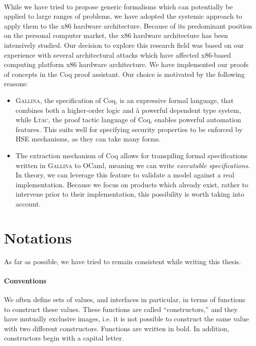 \paragraph{}
%
While we have tried to propose generic formalisms which can potentially be
applied to large ranges of problems, we have adopted the systemic approach to
apply them to the x86 hardware architecture.
%
Because of its predominant position on the personal computer market, the x86
hardware architecture has been intensively studied.
%
Our decision to explore this research field was based on our experience with
several architectural attacks which have affected x86-based computing platform
x86 hardware architecture.
%
We have implemented our proofs of concepts in the Coq proof assistant.
%
Our choice is motivated by the following reasons:
%
\begin{itemize}
\item {\scshape Gallina}, the specification of Coq, is an expressive formal language,
  that combines both a higher-order logic and à powerful dependent type system,
  while {\scshape Ltac}, the proof tactic language of Coq, enables powerful
  automation features.
  This suits well for specifying security properties to be enforced by HSE
  mechanisms, as they can take many forms.
\item The extraction mechanism of Coq allows for transpiling formal
  specifications written in {\scshape Gallina} to OCaml, meaning we can write
  \emph{executable specifications}.
  In theory, we can leverage this feature to validate a model against a real
  implementation.
  Because we focus on products which already exist, rather to intervene prior to
  their implementation, this possibility is worth taking into account.
\end{itemize}

\section{Notations}

As far as possible, we have tried to remain consistent while writing this
thesis. 

\paragraph{Conventions}
%
We often define sets of values, and interfaces in particular, in terms of
functions to construct these values.
%
These functions are called ``constructors,'' and they have mutually exclusive
images, i.e. it is not possible to construct the same value with two different
constructors.
%
Functions are written in bold.
%
In addition, constructors begin with a capital letter.


